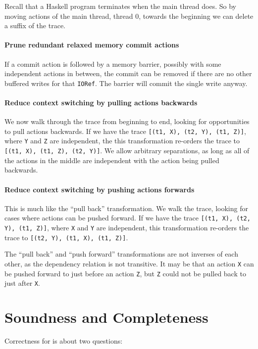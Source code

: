 Recall that a Haskell program terminates when the main thread does.
So by moving actions of the main thread, thread 0, towards the
beginning we can delete a suffix of the trace.

\paragraph{Prune redundant relaxed memory commit actions}
If a commit action is followed by a memory barrier, possibly with some
independent actions in between, the commit can be removed if there are
no other buffered writes for that \verb|IORef|.  The barrier will
commit the single write anyway.

\paragraph{Reduce context switching by pulling actions backwards}
We now walk through the trace from beginning to end, looking for
opportunities to pull actions backwards.  If we have the trace
\verb|[(t1, X), (t2, Y), (t1, Z)]|, where \verb|Y| and \verb|Z| are
independent, the this transformation re-orders the trace to
\verb|[(t1, X), (t1, Z), (t2, Y)]|.  We allow arbitrary separations,
as long as all of the actions in the middle are independent with the
action being pulled backwards.

\paragraph{Reduce context switching by pushing actions forwards}
This is much like the ``pull back'' transformation.  We walk the
trace, looking for cases where actions can be pushed forward.  If we
have the trace \verb|[(t1, X), (t2, Y), (t1, Z)]|, where \verb|X| and
\verb|Y| are independent, this transformation re-orders the trace to
\verb|[(t2, Y), (t1, X), (t1, Z)]|.

The ``pull back'' and ``push forward'' transformations are not
inverses of each other, as the dependency relation is not transitive.
It may be that an action \verb|X| can be pushed forward to just before
an action \verb|Z|, but \verb|Z| could not be pulled back to just
after \verb|X|.

\section{Soundness and Completeness}
\label{sec:dejafu-correctness}

Correctness for \dejafu{} is about two questions:

